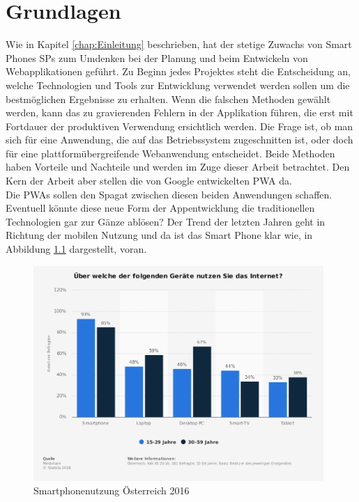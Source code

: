 \chapter{Grundlagen}
\thispagestyle{standard}
\pagestyle{standard}
\renewcommand{\footrulewidth}{0.4pt}

Wie in Kapitel \ref{chap:Einleitung} beschrieben, hat der stetige Zuwachs von Smart Phones \acs{SP}s \cite{Geraetenutzung} zum Umdenken bei der Planung und beim Entwickeln von Webapplikationen geführt.
Zu Beginn jedes Projektes steht die Entscheidung an, welche Technologien und Tools zur Entwicklung verwendet werden sollen um die bestmöglichen Ergebnisse zu erhalten.
Wenn die falschen Methoden gewählt werden, kann das zu gravierenden Fehlern in der Applikation führen, die erst mit Fortdauer der produktiven Verwendung ersichtlich werden. 
Die Frage ist, ob man sich für eine Anwendung, die auf das Betriebssystem zugeschnitten ist, oder doch für eine plattformübergreifende Webanwendung entscheidet. Beide Methoden haben Vorteile und Nachteile und werden im Zuge dieser Arbeit betrachtet. Den Kern der Arbeit aber stellen die von Google entwickelten \acs{PWA} \cite{PWA} da. \\Die \acs{PWA}s sollen den Spagat zwischen diesen beiden Anwendungen schaffen. Eventuell könnte diese neue Form der Appentwicklung die traditionellen Technologien gar zur Gänze ablösen?
Der Trend der letzten Jahren geht in Richtung der mobilen Nutzung und da ist das Smart Phone klar wie, in Abbildung \ref{fig:Smartphonenutzung} dargestellt, voran.  


\begin{figure}[h]
	\centering
	\includegraphics[width=11cm]{BilderAllgemein/SmartPhoneNutzung}\medskip
	\caption{Smartphonenutzung Österreich 2016 \cite{Geraetenutzung}}
	\label{fig:Smartphonenutzung}
\end{figure}

